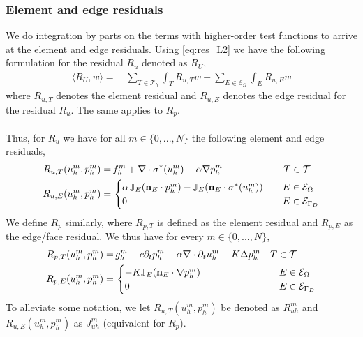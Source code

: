 \subsubsection{Element and edge residuals}
We do integration by parts on the terms with higher-order test functions to arrive at the element and edge residuals. Using \eqref{eq:res_L2} we have the following formulation for the residual $R_u$ denoted as $R_U$,
\begin{align} \label{eq:gen_res}
\langle R_U, w \rangle = & \, \sum_{T \in \mathcal{T}_h} \int_T R_{u,T} w + \sum_{E \in \mathcal{E}_\Omega} \int_E R_{u,E} w  
\end{align}
where $R_{u,T}$ denotes the element residual and $R_{u,E}$ denotes the edge residual for the residual $R_u$. The same applies to $R_p$. 
\\
\\
Thus, for $R_u$ we have for all $m\in\{0,...,N\}$ the following element and edge residuals, 
\\
\begin{align} \label{biot_element_res}
R_{u,T}(u_h^m,p_h^m) = & \, f_h^m + \nabla \cdot \sigma^{\ast}(u_h^m) - \alpha \nabla p_h^m \hspace{2.2cm}  T \in \mathcal{T}\\ 
R_{u,E}(u_h^m,p_h^m)  = & \, \begin{cases} 
	\alpha \, \mathbb{J}_E(\mathbf{n}_E \cdot p_h^m) - \mathbb{J}_E(\mathbf{n}_E \cdot \sigma^{\ast}(u_h^m)) & \quad  E \in \mathcal{E}_\Omega \\
     0 & \quad E \in \mathcal{E}_{\Gamma_D} \\
\end{cases}
\end{align} 
We define $R_p$ similarly, where $R_{p,T}$ is defined as the element residual and $R_{p,E}$ as the edge/face residual. We thus have for every $m \in \{0,...,N\}$,
\\
\begin{align}
R_{p,T}(u_h^m,p_h^m)  = & \, g^m_h - c\partial_t p^m_h - \alpha \nabla \cdot \partial_t u_h^m + K \Delta p_h^m \quad  T \in \mathcal{T}\\ 
R_{p,E}(u_h^m,p_h^m)  = & \, \begin{cases} 
	- K \mathbb{J}_E(\mathbf{n}_E \cdot \nabla p_h^m)  & \hspace{2.5cm}  E \in \mathcal{E}_\Omega \\
     0 & \hspace{2.5cm} E \in \mathcal{E}_{\Gamma_D} \\
\end{cases}
\end{align}
To alleviate some notation, we let $R_{u,T}(u_h^m,p_h^m)$ be denoted as $R^m_{uh}$ and $R_{u,E}(u_h^m,p_h^m)$ as $J^m_{uh}$ (equivalent for $R_p$).
\\
\\
